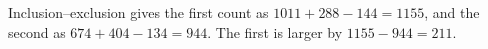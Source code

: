 Inclusion--exclusion gives the first count as $1011+288-144=1155$, and the second as $674+404-134=944$. The first is larger by $1155-944=\boxed{211}$.
